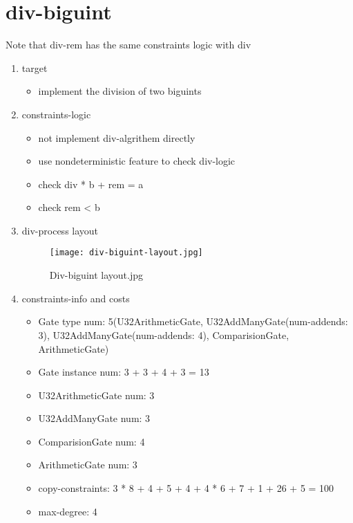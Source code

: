 \section{div-biguint}
\label{div-biguint}

Note that div-rem has the same constraints logic with div

\begin{enumerate}
    \item target
        \begin{itemize}
            \item implement the division of two biguints
        \end{itemize}
    \item constraints-logic
        \begin{itemize}
            \item not implement div-algrithem directly
            \item use nondeterministic feature to check div-logic
            \item check div * b + rem = a
            \item check rem < b
        \end{itemize}
    \item div-process layout
        \begin{figure}[!ht]
            \centering
            \texttt{[image: div-biguint-layout.jpg]}
            \caption{Div-biguint layout.jpg}
            \label{fig:div-biguint-layout.jpg}
        \end{figure}
    
    \item constraints-info and costs
        \begin{itemize}
            \item Gate type num: 5(U32ArithmeticGate, U32AddManyGate(num-addends: 3), U32AddManyGate(num-addends: 4), ComparisionGate, ArithmeticGate)
            \item Gate instance num: 3 + 3 + 4 + 3 = 13 
            \item U32ArithmeticGate num: 3
            \item U32AddManyGate num: 3
            \item ComparisionGate num: 4
            \item ArithmeticGate num: 3
            \item copy-constraints: 3 * 8 + 4 + 5 + 4 + 4 * 6 + 7 + 1 + 26 + 5 = 100 
            \item max-degree: 4
        \end{itemize}

\end{enumerate}